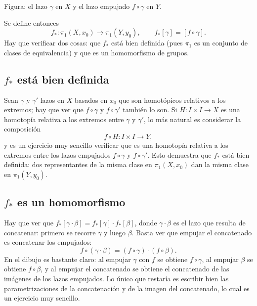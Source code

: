 \documentclass[11pt]{article}
\begin{document}
\begin{center}
\end{center}

\noindent Figura: el lazo $\gamma$ en $X$ y el lazo empujado $f\circ\gamma$ en $Y$.

Se define entonces
\[
  f_*\colon\pi_1(X,x_0)\to\pi_1(Y,y_0),\qquad f_*[\gamma]=[f\circ\gamma].
\]
Hay que verificar dos cosas: que $f_*$ está bien definida (pues $\pi_1$ es un conjunto de clases de equivalencia) y que es un homomorfismo de grupos.

\subsection*{$f_*$ está bien definida}

Sean $\gamma$ y $\gamma'$ lazos en $X$ basados en $x_0$ que son homotópicos relativos a los extremos; hay que ver que $f\circ\gamma$ y $f\circ\gamma'$ también lo son. Si $H\colon I\times I\to X$ es una homotopía relativa a los extremos entre $\gamma$ y $\gamma'$, lo más natural es considerar la composición
\[
  f\circ H\colon I\times I\to Y,
\]
y es un ejercicio muy sencillo verificar que es una homotopía relativa a los extremos entre los lazos empujados $f\circ\gamma$ y $f\circ\gamma'$. Esto demuestra que $f_*$ está bien definida: dos representantes de la misma clase en $\pi_1(X,x_0)$ dan la misma clase en $\pi_1(Y,y_0)$.

\subsection*{$f_*$ es un homomorfismo}

Hay que ver que $f_*[\gamma\cdot\beta]=f_*[\gamma]\cdot f_*[\beta]$, donde $\gamma\cdot\beta$ es el lazo que resulta de concatenar: primero se recorre $\gamma$ y luego $\beta$. Basta ver que empujar el concatenado es concatenar los empujados:
\[
  f\circ(\gamma\cdot\beta)=(f\circ\gamma)\cdot(f\circ\beta).
\]
En el dibujo es bastante claro: al empujar $\gamma$ con $f$ se obtiene $f\circ\gamma$, al empujar $\beta$ se obtiene $f\circ\beta$, y al empujar el concatenado se obtiene el concatenado de las imágenes de los lazos empujados. Lo único que restaría es escribir bien las parametrizaciones de la concatenación y de la imagen del concatenado, lo cual es un ejercicio muy sencillo.
\end{document}
